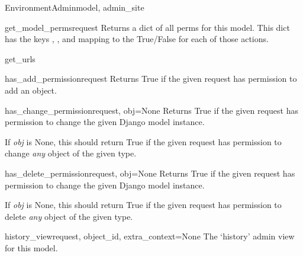 \documentclass[letterpaper,10pt,english]{sphinxmanual}
\begin{document}
\begin{classdesc}{EnvironmentAdmin}{model, admin\_site}
\hypertarget{data.admin.EnvironmentAdmin.get_model_perms}{}\begin{methoddesc}{get\_model\_perms}{request}
Returns a dict of all perms for this model. This dict has the keys
, , and  mapping to the True/False for each
of those actions.
\end{methoddesc}

\hypertarget{data.admin.EnvironmentAdmin.get_urls}{}\begin{methoddesc}{get\_urls}{}\end{methoddesc}

\hypertarget{data.admin.EnvironmentAdmin.has_add_permission}{}\begin{methoddesc}{has\_add\_permission}{request}
Returns True if the given request has permission to add an object.
\end{methoddesc}

\hypertarget{data.admin.EnvironmentAdmin.has_change_permission}{}\begin{methoddesc}{has\_change\_permission}{request, obj=None}
Returns True if the given request has permission to change the given
Django model instance.

If \emph{obj} is None, this should return True if the given request has
permission to change \emph{any} object of the given type.
\end{methoddesc}

\hypertarget{data.admin.EnvironmentAdmin.has_delete_permission}{}\begin{methoddesc}{has\_delete\_permission}{request, obj=None}
Returns True if the given request has permission to change the given
Django model instance.

If \emph{obj} is None, this should return True if the given request has
permission to delete \emph{any} object of the given type.
\end{methoddesc}

\hypertarget{data.admin.EnvironmentAdmin.history_view}{}\begin{methoddesc}{history\_view}{request, object\_id, extra\_context=None}
The `history' admin view for this model.
\end{methoddesc}


\end{classdesc}
\end{document}
